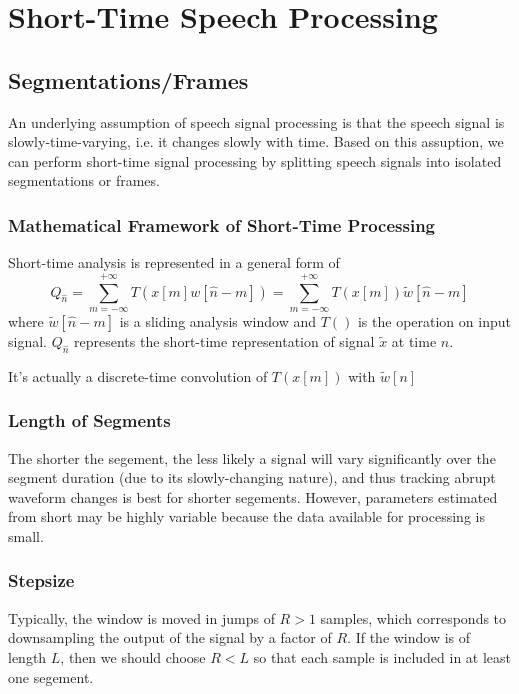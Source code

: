 \chapter{Short-Time Speech Processing}
\newpage

\section{Segmentations/Frames}
An underlying assumption of speech signal processing is that the speech signal is slowly-time-varying, i.e. it changes slowly with time. Based on this assuption, we can perform short-time signal processing by splitting speech signals into isolated segmentations or frames.

\subsection{Mathematical Framework of Short-Time Processing}
Short-time analysis is represented in a general form of
\[ Q_{\hat{n}} = \sum_{m=-\infty}^{+\infty}T(x[m]w[\hat{n}-m]) = \sum_{m=-\infty}^{+\infty}T(x[m])\tilde{w}[\hat{n}-m] \]
where $\tilde{w}[\hat{n}-m]$ is a sliding analysis window and $T()$ is the operation on input signal. $Q_{\hat{n}}$ represents the short-time representation of signal $\tilde{x}$ at time $\hat{n}$.
\begin{remark}
    It's actually a discrete-time convolution of $T(x[m])$ with $\tilde{w}[n]$
\end{remark}

\subsection{Length of Segments}
The shorter the segement, the less likely a signal will vary significantly over the segment duration (due to its slowly-changing nature), and thus tracking abrupt waveform changes is best for shorter segements.
However, parameters estimated from short may be highly variable because the data available for processing is small.

\subsection{Stepsize}
Typically, the window is moved in jumps of $R>1$ samples, which corresponds to downsampling the output of the signal by a factor of $R$. If the window is of length $L$, then we should choose $R<L$ so that each sample is included in at least one segement. 


